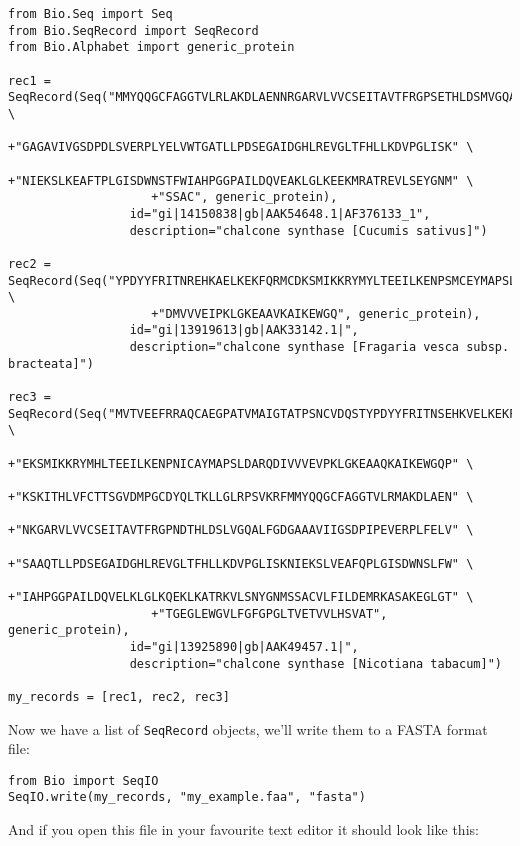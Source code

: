 \begin{verbatim}
from Bio.Seq import Seq
from Bio.SeqRecord import SeqRecord
from Bio.Alphabet import generic_protein

rec1 = SeqRecord(Seq("MMYQQGCFAGGTVLRLAKDLAENNRGARVLVVCSEITAVTFRGPSETHLDSMVGQALFGD" \
                    +"GAGAVIVGSDPDLSVERPLYELVWTGATLLPDSEGAIDGHLREVGLTFHLLKDVPGLISK" \
                    +"NIEKSLKEAFTPLGISDWNSTFWIAHPGGPAILDQVEAKLGLKEEKMRATREVLSEYGNM" \
                    +"SSAC", generic_protein),
                 id="gi|14150838|gb|AAK54648.1|AF376133_1",
                 description="chalcone synthase [Cucumis sativus]")

rec2 = SeqRecord(Seq("YPDYYFRITNREHKAELKEKFQRMCDKSMIKKRYMYLTEEILKENPSMCEYMAPSLDARQ" \
                    +"DMVVVEIPKLGKEAAVKAIKEWGQ", generic_protein),
                 id="gi|13919613|gb|AAK33142.1|",
                 description="chalcone synthase [Fragaria vesca subsp. bracteata]")

rec3 = SeqRecord(Seq("MVTVEEFRRAQCAEGPATVMAIGTATPSNCVDQSTYPDYYFRITNSEHKVELKEKFKRMC" \
                    +"EKSMIKKRYMHLTEEILKENPNICAYMAPSLDARQDIVVVEVPKLGKEAAQKAIKEWGQP" \
                    +"KSKITHLVFCTTSGVDMPGCDYQLTKLLGLRPSVKRFMMYQQGCFAGGTVLRMAKDLAEN" \
                    +"NKGARVLVVCSEITAVTFRGPNDTHLDSLVGQALFGDGAAAVIIGSDPIPEVERPLFELV" \
                    +"SAAQTLLPDSEGAIDGHLREVGLTFHLLKDVPGLISKNIEKSLVEAFQPLGISDWNSLFW" \
                    +"IAHPGGPAILDQVELKLGLKQEKLKATRKVLSNYGNMSSACVLFILDEMRKASAKEGLGT" \
                    +"TGEGLEWGVLFGFGPGLTVETVVLHSVAT", generic_protein),
                 id="gi|13925890|gb|AAK49457.1|",
                 description="chalcone synthase [Nicotiana tabacum]")

my_records = [rec1, rec2, rec3]
\end{verbatim}

\noindent Now we have a list of \verb|SeqRecord| objects, we'll write them to a FASTA format file:

\begin{verbatim}
from Bio import SeqIO
SeqIO.write(my_records, "my_example.faa", "fasta")
\end{verbatim}

\noindent And if you open this file in your favourite text editor it should look like this:

